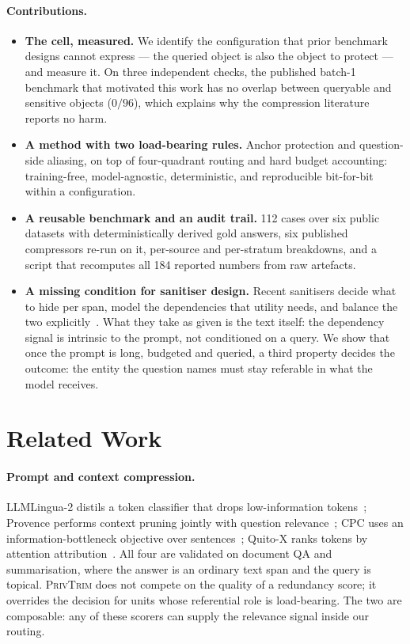 \documentclass[conference]{IEEEtran}
\newcommand{\ours}{\textsc{PrivTrim}}
\begin{document}
\paragraph{Contributions.}
\begin{itemize}
\item \textbf{The cell, measured.} We identify the configuration that prior benchmark designs
cannot express --- the queried object is also the object to protect --- and measure it. On three
independent checks, the published batch-1 benchmark that motivated this work has no overlap
between queryable and sensitive objects ($0/96$), which explains why the compression
literature reports no harm.
\item \textbf{A method with two load-bearing rules.} Anchor protection and question-side
aliasing, on top of four-quadrant routing and hard budget accounting: training-free,
model-agnostic, deterministic, and reproducible bit-for-bit within a configuration.
\item \textbf{A reusable benchmark and an audit trail.} 112 cases over six public datasets with
deterministically derived gold answers, six published compressors re-run on it, per-source and
per-stratum breakdowns, and a script that recomputes all 184 reported numbers from raw
artefacts.
\item \textbf{A missing condition for sanitiser design.} Recent sanitisers decide what to hide
per span, model the dependencies that utility needs, and balance the two
explicitly~\cite{dyntext,promptgraph}. What they take as given is the text itself: the
dependency signal is intrinsic to the prompt, not conditioned on a query. We show that once the
prompt is long, budgeted and queried, a third property decides the outcome: the entity the
question names must stay
referable in what the model receives.
\end{itemize}

\section{Related Work}
\label{sec:related}

\paragraph{Prompt and context compression.}
LLMLingua-2 distils a token classifier that drops low-information tokens~\cite{llmlingua2};
Provence performs context pruning jointly with question relevance~\cite{provence}; CPC uses an
information-bottleneck objective over sentences~\cite{cpc}; Quito-X ranks tokens by attention
attribution~\cite{quitox}. All four are validated on document QA and summarisation, where the
answer is an ordinary text span and the query is topical. \ours{} does not compete on the
quality of a redundancy score; it overrides the decision for units whose referential role is
load-bearing. The two are composable: any of these scorers can supply the relevance signal
inside our routing.
\end{document}
